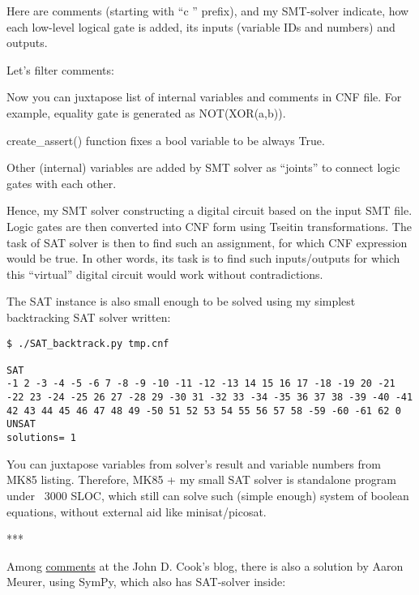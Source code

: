 Here are comments (starting with ``c '' prefix), and my SMT-solver indicate, how each low-level logical gate is added,
its inputs (variable IDs and numbers) and outputs.

Let's filter comments:



Now you can juxtapose list of internal variables and comments in CNF file.
For example, equality gate is generated as NOT(XOR(a,b)).

create\_assert() function fixes a bool variable to be always True.

Other (internal) variables are added by SMT solver as ``joints'' to connect logic gates with each other.

Hence, my SMT solver constructing a digital circuit based on the input SMT file.
Logic gates are then converted into CNF form using Tseitin transformations.
The task of SAT solver is then to find such an assignment, for which CNF expression would be true.
In other words, its task is to find such inputs/outputs for which this ``virtual'' digital circuit would work
without contradictions.

The SAT instance is also small enough to be solved using my simplest backtracking SAT solver written:

\begin{lstlisting}
$ ./SAT_backtrack.py tmp.cnf

SAT
-1 2 -3 -4 -5 -6 7 -8 -9 -10 -11 -12 -13 14 15 16 17 -18 -19 20 -21 -22 23 -24 -25 26 27 -28 29 -30 31 -32 33 -34 -35 36 37 38 -39 -40 -41 42 43 44 45 46 47 48 49 -50 51 52 53 54 55 56 57 58 -59 -60 -61 62 0
UNSAT
solutions= 1
\end{lstlisting}

You can juxtapose variables from solver's result and variable numbers from MK85 listing.
Therefore, MK85 + my small SAT solver is standalone program under ~3000 SLOC, which still can solve such (simple enough) system of boolean equations, without external aid like minisat/picosat.

***

Among \href{https://www.johndcook.com/blog/2015/07/06/multiple-choice/}{comments} at the John D. Cook's blog, there is also a solution by Aaron Meurer, using SymPy,
which also has SAT-solver inside:

